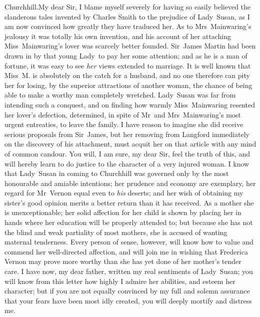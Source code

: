 \begin{mail}{Churchhill.}{My dear Sir,}
I blame myself severely for having so easily believed the slanderous tales invented by Charles Smith to the prejudice of Lady~Susan, as I am now convinced how greatly they have traduced her. As to Mrs~Mainwaring's jealousy it was totally his own invention, and his account of her attaching Miss~Mainwaring's lover was scarcely better founded. Sir~James Martin had been drawn in by that young Lady~to pay her some attention; and as he is a man of fortune, it was easy to see \textit{her} views extended to marriage. It is well known that Miss~M. is absolutely on the catch for a husband, and no one therefore can pity her for losing, by the superior attractions of another woman, the chance of being able to make a worthy man completely wretched. Lady~Susan was far from intending such a conquest, and on finding how warmly Miss~Mainwaring resented her lover's defection, determined, in spite of Mr~and Mrs~Mainwaring's most urgent entreaties, to leave the family. I have reason to imagine she did receive serious proposals from Sir~James, but her removing from Langford immediately on the discovery of his attachment, must acquit her on that article with any mind of common candour. You will, I am sure, my dear Sir, feel the truth of this, and will hereby learn to do justice to the character of a very injured woman. I know that Lady~Susan in coming to Churchhill was governed only by the most honourable and amiable intentions; her prudence and economy are exemplary, her regard for Mr~Vernon equal even to \textit{his} deserts; and her wish of obtaining my sister's good opinion merits a better return than it has received. As a mother she is unexceptionable; her solid affection for her child is shown by placing her in hands where her education will be properly attended to; but because she has not the blind and weak partiality of most mothers, she is accused of wanting maternal tenderness. Every person of sense, however, will know how to value and commend her well-directed affection, and will join me in wishing that Frederica Vernon may prove more worthy than she has yet done of her mother's tender care. I have now, my dear father, written my real sentiments of Lady~Susan; you will know from this letter how highly I admire her abilities, and esteem her character; but if you are not equally convinced by my full and solemn assurance that your fears have been most idly created, you will deeply mortify and distress me. 

\end{mail}